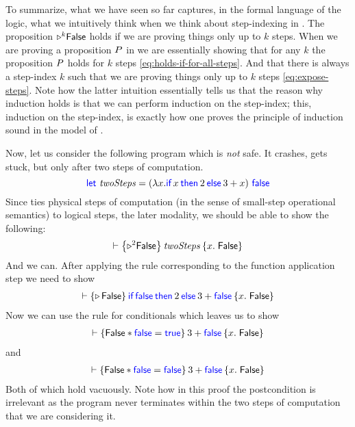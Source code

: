 To summarize, what we have seen so far captures, in the formal language of the logic, what we intuitively think when we think about step-indexing in \Iris{}.
The proposition ${\mathop{{\triangleright}}}^{k} \textsf{\upshape False}$ holds if we are proving things only up to $k$ steps.
When we are proving a proposition $P$ in \Iris{} we are essentially showing that for any $k$ the proposition $P$ holds for $k$ steps \eqref{eq:holds-if-for-all-steps}.
And that there is always a step-index $k$ such that we are proving things only up to $k$ steps \eqref{eq:expose-steps}.
Note how the latter intuition essentially tells us that the reason why  induction holds is that we can perform induction on the step-index; this, \ie{} induction on the step-index, is exactly how one proves the principle of  induction sound in the model of \Iris{} \cite{iris-ground-up}.

Now, let us consider the following program which is \emph{not} safe.
It crashes, \ie{} gets stuck, but only after two steps of computation.
\[ \langkw{let}~ \mathit{twoSteps} = (\lambda \var. \If \var then 2 \Else 3 + \var)~\False \]
Since \Iris{} ties physical steps of computation (in the sense of small-step operational semantics) to logical steps, \ie{} the later modality, we should be able to show the following:
\begin{align*}
  \proves \hoare{{\later}^{2} \FALSE}{\mathit{twoSteps}}{\var.\; \FALSE}
\end{align*}
And we can.
After applying the rule  corresponding to the function application step we need to show
\begin{align*}
  \proves \hoare{\later \FALSE}{\If \False then 2 \Else 3 + \False}{\var.\; \FALSE}
\end{align*}
Now we can use the rule  for conditionals which leaves us to show
\begin{align*}
  \proves \hoare{\FALSE \ast \False = \True}{3 + \False}{\var.\; \FALSE}
\end{align*}
and
\begin{align*}
  \proves \hoare{\FALSE \ast \False = \False}{3 + \False}{\var.\; \FALSE}
\end{align*}
Both of which hold vacuously.
Note how in this proof the postcondition is irrelevant as the program never terminates within the two steps of computation that we are considering it.

